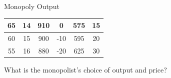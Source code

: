 \documentclass{beamer}
\begin{document}
\begin{frame}[t]{Monopoly Output}
\begin{table}[H]
\begin{tabular}{cccccc}
    65         & 14                                                           & 910                                                      & 0                                                           & 575                                                                & 15                                                      \\ \hline
    60         & 15                                                           & 900                                                      & -10                                                         & 595                                                                & 20                                                      \\ \hline
    55         & 16                                                           & 880                                                      & -20                                                         & 625                                                                & 30                                                     
    \end{tabular}
    \end{table}
    What is the monopolist's choice of output and price?
\end{frame}
\end{document}
